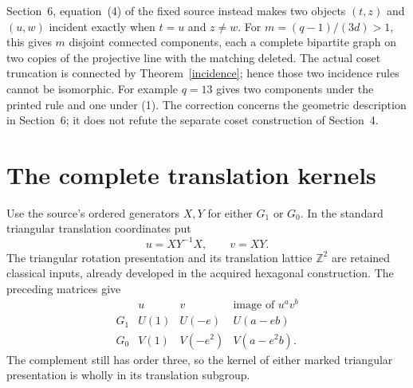 \documentclass[11pt,a4paper]{article}
\newcommand{\Z}{\mathbb Z}
\begin{document}
Section~6, equation~(4) of the fixed source instead makes two
objects $(t,z)$ and $(u,w)$ incident exactly when $t=u$ and
$z\ne w$. For $m=(q-1)/(3d)>1$, this gives $m$ disjoint connected
components, each a complete bipartite graph on two copies of the
projective line with the matching deleted. The actual coset
truncation is connected by Theorem~\ref{incidence}; hence those
two incidence rules cannot be isomorphic. For example $q=13$
gives two components under the printed rule and one under (1).
The correction concerns the geometric description in Section~6;
it does not refute the separate coset construction of Section~4.



\section{The complete translation kernels}

Use the source's ordered generators $X,Y$ for either $G_1$ or
$G_0$. In the standard triangular translation coordinates put
\[
                        u=XY^{-1}X,\qquad v=XY.
\]
The triangular rotation presentation and its translation lattice
$\Z^2$ are retained classical inputs, already developed in the
acquired hexagonal construction. The preceding matrices give
\[
\begin{array}{c|cc|c}
 &u&v&\text{image of }u^a v^b\\\hline
 G_1&U(1)&U(-e)&U(a-eb)\\
 G_0&V(1)&V(-e^2)&V(a-e^2b).
\end{array}                                                   \tag{3}
\]
The complement still has order three, so the kernel of either
marked triangular presentation is wholly in its translation subgroup.
\end{document}
